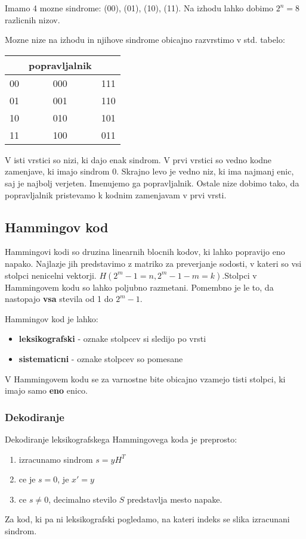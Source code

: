 \documentclass{article}
\begin{document}
\begin{multicols}{4}
	Imamo 4 mozne sindrome: (00), (01), (10), (11). Na izhodu lahko dobimo $2^n = 8$
	razlicnih nizov.

	Mozne nize na izhodu in njihove sindrome obicajno razvrstimo v std. tabelo:
	\begin{center}
		\begin{tabular}{ c|cc }
			\text{sindrom} & popravljalnik &     \\
			\hline
			00             & 000           & 111 \\
			01             & 001           & 110 \\
			10             & 010           & 101 \\
			11             & 100           & 011
		\end{tabular}
	\end{center}

	V isti vrstici so nizi, ki dajo enak sindrom. V prvi vrstici so vedno kodne zamenjave, ki
	imajo sindrom 0. Skrajno levo je vedno niz, ki ima najmanj enic, saj je najbolj verjeten.
	Imenujemo ga popravljalnik. Ostale nize dobimo tako, da popravljalnik pristevamo k kodnim
	zamenjavam v prvi vrsti.

	\subsection{Hammingov kod}
	Hammingovi kodi so druzina linearnih blocnih kodov, ki lahko popravijo eno napako.
	Najlazje jih predstavimo z matriko za preverjanje sodosti, v kateri so vsi stolpci
	nenicelni vektorji.
	$H(2^m - 1 = n, 2^m - 1 - m = k)$.Stolpci v Hammingovem kodu so lahko
	poljubno razmetani. Pomembno je le to, da nastopajo \textbf{vsa} stevila od 1 do $2^m - 1$.

	Hammingov kod je lahko:
	\begin{itemize}
		\item \textbf{leksikografski} - oznake stolpcev si sledijo po vrsti
		\item \textbf{sistematicni} - oznake stolpcev so pomesane
	\end{itemize}

	V Hammingovem kodu se za varnostne bite obicajno vzamejo tisti stolpci, ki imajo samo \textbf{eno} enico.

	\subsubsection{Dekodiranje}
	Dekodiranje leksikografskega Hammingovega koda je preprosto:
	\begin{enumerate}
		\item izracunamo sindrom $s = yH^T$
		\item ce je $s = 0$, je $x' = y$
		\item ce $s \neq 0$, decimalno stevilo $S$ predstavlja mesto napake.
	\end{enumerate}
	Za kod, ki pa ni leksikografski pogledamo, na kateri indeks se slika izracunani sindrom.


\end{multicols}
\end{document}
